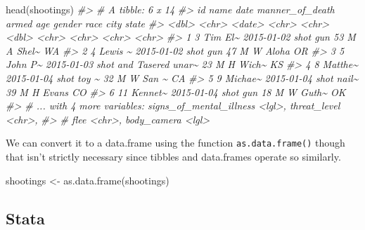 \documentclass[
  12pt,
]{book}
\newenvironment{Shaded}{\begin{snugshade}}{\end{snugshade}}
\newcommand{\CommentTok}[1]{\textcolor[rgb]{0.37,0.37,0.37}{\textit{#1}}}
\newcommand{\FunctionTok}[1]{\textcolor[rgb]{0,0,0}{#1}}
\newcommand{\NormalTok}[1]{#1}
\newcommand{\OtherTok}[1]{\textcolor[rgb]{0.37,0.37,0.37}{#1}}
\begin{document}
\begin{Shaded}
\begin{Highlighting}[]
\FunctionTok{head}\NormalTok{(shootings)}
\CommentTok{\#\textgreater{} \# A tibble: 6 x 14}
\CommentTok{\#\textgreater{}      id name    date       manner\_of\_death  armed   age gender race  city  state}
\CommentTok{\#\textgreater{}   \textless{}dbl\textgreater{} \textless{}chr\textgreater{}   \textless{}date\textgreater{}     \textless{}chr\textgreater{}            \textless{}chr\textgreater{} \textless{}dbl\textgreater{} \textless{}chr\textgreater{}  \textless{}chr\textgreater{} \textless{}chr\textgreater{} \textless{}chr\textgreater{}}
\CommentTok{\#\textgreater{} 1     3 Tim El\textasciitilde{} 2015{-}01{-}02 shot             gun      53 M      A     Shel\textasciitilde{} WA   }
\CommentTok{\#\textgreater{} 2     4 Lewis \textasciitilde{} 2015{-}01{-}02 shot             gun      47 M      W     Aloha OR   }
\CommentTok{\#\textgreater{} 3     5 John P\textasciitilde{} 2015{-}01{-}03 shot and Tasered unar\textasciitilde{}    23 M      H     Wich\textasciitilde{} KS   }
\CommentTok{\#\textgreater{} 4     8 Matthe\textasciitilde{} 2015{-}01{-}04 shot             toy \textasciitilde{}    32 M      W     San \textasciitilde{} CA   }
\CommentTok{\#\textgreater{} 5     9 Michae\textasciitilde{} 2015{-}01{-}04 shot             nail\textasciitilde{}    39 M      H     Evans CO   }
\CommentTok{\#\textgreater{} 6    11 Kennet\textasciitilde{} 2015{-}01{-}04 shot             gun      18 M      W     Guth\textasciitilde{} OK   }
\CommentTok{\#\textgreater{} \# ... with 4 more variables: signs\_of\_mental\_illness \textless{}lgl\textgreater{}, threat\_level \textless{}chr\textgreater{},}
\CommentTok{\#\textgreater{} \#   flee \textless{}chr\textgreater{}, body\_camera \textless{}lgl\textgreater{}}
\end{Highlighting}
\end{Shaded}

We can convert it to a data.frame using the function \texttt{as.data.frame()} though that isn't strictly necessary since tibbles and data.frames operate so similarly.

\begin{Shaded}
\begin{Highlighting}[]
\NormalTok{shootings }\OtherTok{\textless{}{-}} \FunctionTok{as.data.frame}\NormalTok{(shootings)}
\end{Highlighting}
\end{Shaded}

\hypertarget{stata}{%
\subsection{Stata}\label{stata}}
\end{document}
